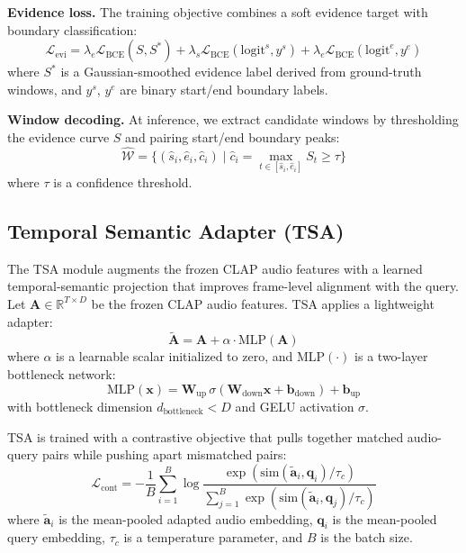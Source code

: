 \documentclass[conference]{IEEEtran}
\begin{document}
\textbf{Evidence loss.}  The training objective combines a soft evidence target
with boundary classification:
\begin{equation}
\label{eq:evidence_loss}
\mathcal{L}_{\text{evi}} = \lambda_e \mathcal{L}_{\text{BCE}}(S, S^{*}) +
\lambda_s \mathcal{L}_{\text{BCE}}(\text{logit}^s, y^s) +
\lambda_e \mathcal{L}_{\text{BCE}}(\text{logit}^e, y^e)
\end{equation}
where \(S^{*}\) is a Gaussian-smoothed evidence label derived from ground-truth
windows, and \(y^s\), \(y^e\) are binary start/end boundary labels.

\textbf{Window decoding.}  At inference, we extract candidate windows by
thresholding the evidence curve \(S\) and pairing start/end boundary peaks:
\begin{equation}
\label{eq:decode}
\hat{\mathcal{W}} = \{(\hat{s}_i, \hat{e}_i, \hat{c}_i) \mid
\hat{c}_i = \max_{t \in [\hat{s}_i, \hat{e}_i]} S_t \geq \tau \}
\end{equation}
where \(\tau\) is a confidence threshold.

\subsection{Temporal Semantic Adapter (TSA)}
\label{sec:tsa}

The TSA module augments the frozen CLAP audio features with a learned
temporal-semantic projection that improves frame-level alignment with the query.
Let \(\mathbf{A} \in \mathbb{R}^{T \times D}\) be the frozen CLAP audio features.
TSA applies a lightweight adapter:
\begin{equation}
\label{eq:tsa}
\tilde{\mathbf{A}} = \mathbf{A} + \alpha \cdot \text{MLP}(\mathbf{A})
\end{equation}
where \(\alpha\) is a learnable scalar initialized to zero, and
\(\text{MLP}(\cdot)\) is a two-layer bottleneck network:
\begin{equation}
\label{eq:tsa_mlp}
\text{MLP}(\mathbf{x}) = \mathbf{W}_{\text{up}} \, \sigma(\mathbf{W}_{\text{down}}
\mathbf{x} + \mathbf{b}_{\text{down}}) + \mathbf{b}_{\text{up}}
\end{equation}
with bottleneck dimension \(d_{\text{bottleneck}} < D\) and GELU activation
\(\sigma\).

TSA is trained with a contrastive objective that pulls together matched
audio-query pairs while pushing apart mismatched pairs:
\begin{equation}
\label{eq:contrastive}
\mathcal{L}_{\text{cont}} = -\frac{1}{B} \sum_{i=1}^{B} \log
\frac{\exp(\text{sim}(\tilde{\mathbf{a}}_i, \mathbf{q}_i) / \tau_c)}
{\sum_{j=1}^{B} \exp(\text{sim}(\tilde{\mathbf{a}}_i, \mathbf{q}_j) / \tau_c)}
\end{equation}
where \(\tilde{\mathbf{a}}_i\) is the mean-pooled adapted audio embedding,
\(\mathbf{q}_i\) is the mean-pooled query embedding, \(\tau_c\) is a temperature
parameter, and \(B\) is the batch size.
\end{document}
